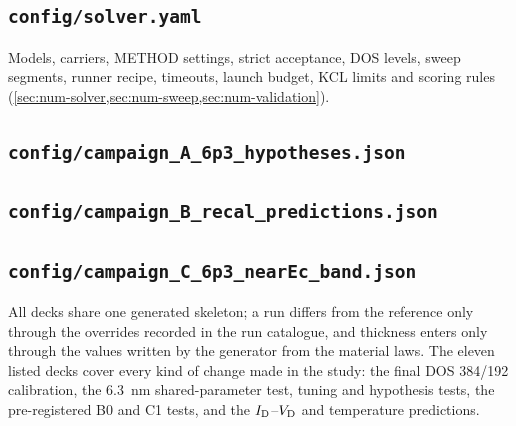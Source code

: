 \subsection{\texttt{config/solver.yaml}}
Models, carriers, METHOD settings, strict acceptance, DOS levels, sweep segments, runner recipe, timeouts, launch budget,
KCL limits and scoring rules (\cref{sec:num-solver,sec:num-sweep,sec:num-validation}).


\subsection{\texttt{config/campaign\_A\_6p3\_hypotheses.json}}


\subsection{\texttt{config/campaign\_B\_recal\_predictions.json}}


\subsection{\texttt{config/campaign\_C\_6p3\_nearEc\_band.json}}


\begin{keyresult}
All decks share one generated skeleton; a run differs from the reference only through the overrides recorded in the run
catalogue, and thickness enters only through the values written by the generator from the material laws. The eleven
listed decks cover every kind of change made in the study: the final DOS 384/192 calibration, the \SI{6.3}{nm}
shared-parameter test, tuning and hypothesis tests, the pre-registered B0 and C1 tests, and the $I_{\mathrm{D}}$--$V_{\mathrm{D}}$ and temperature
predictions.
\end{keyresult}

